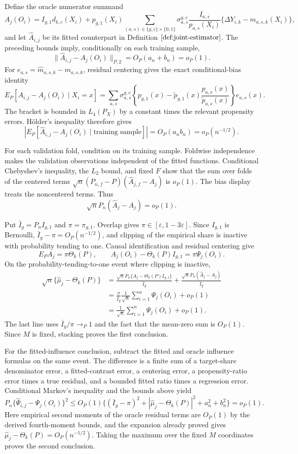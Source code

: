 Define the oracle numerator summand
\[
 A_j(O_i)=I_{g,1}d_{k,c}(X_i)
 +p_{g,1}(X_i)\sum_{(a,s)\in\{g,c\}\times\{0,1\}}
 \sigma_{a,s}^{g,c}\frac{I_{a,s}}{p_{a,s}(X_i)}
 \{\Delta Y_{i,k}-m_{a,s,k}(X_i)\},
\]
and let \(\widehat A_{i,j}\) be its fitted counterpart in Definition \(\ref{def:joint-estimator}\). The preceding bounds imply, conditionally on each training sample,
\[
 \|\widehat A_{i,j}-A_j(O_i)\|_{P,2}=O_P(a_n+b_n)=o_P(1).
\]
For \(e_{a,s}=\widehat m_{a,s,k}-m_{a,s,k}\), residual centering gives the exact conditional-bias identity
\[
 E_P[\widehat A_{i,j}-A_j(O_i)\mid X_i=x]
 =\sum_{a,s}\sigma_{a,s}^{g,c}
 \left\{p_{g,1}(x)-\widetilde p_{g,1}(x)
 \frac{p_{a,s}(x)}{\widetilde p_{a,s}(x)}\right\}e_{a,s}(x).
\]
The bracket is bounded in \(L_4(P_X)\) by a constant times the relevant propensity errors. H\"older's inequality therefore gives
\[
 \left|E_P[\widehat A_{i,j}-A_j(O_i)\mid\text{training sample}]\right|
 =O_P(a_nb_n)=o_P(n^{-1/2}).
\]

For each validation fold, condition on its training sample. Foldwise independence makes the validation observations independent of the fitted functions. Conditional Chebyshev's inequality, the \(L_2\) bound, and fixed \(F\) show that the sum over folds of the centered terms \(\sqrt n(P_{n,f}-P)(\widehat A_{j,f}-A_j)\) is \(o_P(1)\). The bias display treats the noncentered terms. Thus
\[
 \sqrt n P_n(\widehat A_j-A_j)=o_P(1).
\]

Put \(\bar I_g=P_nI_{g,1}\) and \(\pi=\pi_{g,1}\). Overlap gives \(\pi\in[\varepsilon,1-3\varepsilon]\). Since \(I_{g,1}\) is Bernoulli, \(\bar I_g-\pi=O_P(n^{-1/2})\), and clipping of the empirical share is inactive with probability tending to one. Causal identification and residual centering give
\[
 E_PA_j=\pi\Theta_k(P),
 \qquad
 A_j(O_i)-\Theta_k(P)I_{g,1}=\pi\Psi_j(O_i).
\]
On the probability-tending-to-one event where clipping is inactive,
\[
\begin{aligned}
 \sqrt n\{\widehat\mu_j-\Theta_k(P)\}
 &=\frac{\sqrt nP_n\{A_j-\Theta_k(P)I_{g,1}\}}{\bar I_g}
   +\frac{\sqrt nP_n(\widehat A_j-A_j)}{\bar I_g}\\
 &=\frac{\pi}{\bar I_g}\frac1{\sqrt n}\sum_{i=1}^n\Psi_j(O_i)+o_P(1)\\
 &=\frac1{\sqrt n}\sum_{i=1}^n\Psi_j(O_i)+o_P(1).
\end{aligned}
\]
The last line uses \(\bar I_g/\pi\to_P1\) and the fact that the mean-zero sum is \(O_P(1)\). Since \(M\) is fixed, stacking proves the first conclusion.

For the fitted-influence conclusion, subtract the fitted and oracle influence formulas on the same event. The difference is a finite sum of a target-share denominator error, a fitted-contrast error, a centering error, a propensity-ratio error times a true residual, and a bounded fitted ratio times a regression error. Conditional Markov's inequality and the bounds above yield
\[
 P_n\{\widehat\Psi_{i,j}-\Psi_j(O_i)\}^2
 \le O_P(1)\{(\bar I_g-\pi)^2+|\widehat\mu_j-\Theta_k(P)|^2+a_n^2+b_n^2\}=o_P(1).
\]
Here empirical second moments of the oracle residual terms are \(O_P(1)\) by the derived fourth-moment bounds, and the expansion already proved gives \(\widehat\mu_j-\Theta_k(P)=O_P(n^{-1/2})\). Taking the maximum over the fixed \(M\) coordinates proves the second conclusion.